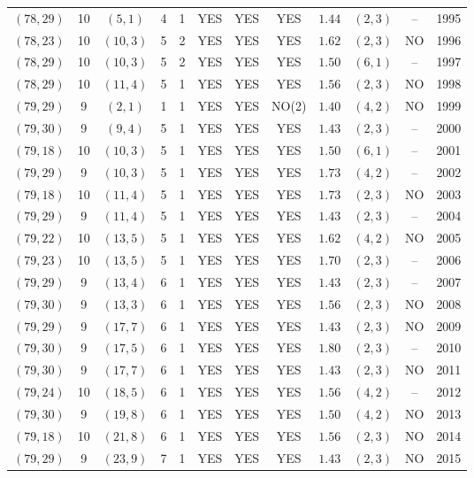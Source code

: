 \begin{longtable}{|c|c|c|c|c|c|c|c|c|c|c|c|}
$(78,29)$ & 10 & $(5,1)$ & 4 & 1 & YES & YES & YES & $1.44$ & $(2,3)$ & -- & 1995\\
$(78,23)$ & 10 & $(10,3)$ & 5 & 2 & YES & YES & YES & $1.62$ & $(2,3)$ & NO & 1996\\
$(78,29)$ & 10 & $(10,3)$ & 5 & 2 & YES & YES & YES & $1.50$ & $(6,1)$ & -- & 1997\\
$(78,29)$ & 10 & $(11,4)$ & 5 & 1 & YES & YES & YES & $1.56$ & $(2,3)$ & NO & 1998\\
$(79,29)$ & 9 & $(2,1)$ & 1 & 1 & YES & YES & NO(2) & $1.40$ & $(4,2)$ & NO & 1999\\
$(79,30)$ & 9 & $(9,4)$ & 5 & 1 & YES & YES & YES & $1.43$ & $(2,3)$ & -- & 2000\\
$(79,18)$ & 10 & $(10,3)$ & 5 & 1 & YES & YES & YES & $1.50$ & $(6,1)$ & -- & 2001\\
$(79,29)$ & 9 & $(10,3)$ & 5 & 1 & YES & YES & YES & $1.73$ & $(4,2)$ & -- & 2002\\
$(79,18)$ & 10 & $(11,4)$ & 5 & 1 & YES & YES & YES & $1.73$ & $(2,3)$ & NO & 2003\\
$(79,29)$ & 9 & $(11,4)$ & 5 & 1 & YES & YES & YES & $1.43$ & $(2,3)$ & -- & 2004\\
$(79,22)$ & 10 & $(13,5)$ & 5 & 1 & YES & YES & YES & $1.62$ & $(4,2)$ & NO & 2005\\
$(79,23)$ & 10 & $(13,5)$ & 5 & 1 & YES & YES & YES & $1.70$ & $(2,3)$ & -- & 2006\\
$(79,29)$ & 9 & $(13,4)$ & 6 & 1 & YES & YES & YES & $1.43$ & $(2,3)$ & -- & 2007\\
$(79,30)$ & 9 & $(13,3)$ & 6 & 1 & YES & YES & YES & $1.56$ & $(2,3)$ & NO & 2008\\
$(79,29)$ & 9 & $(17,7)$ & 6 & 1 & YES & YES & YES & $1.43$ & $(2,3)$ & NO & 2009\\
$(79,30)$ & 9 & $(17,5)$ & 6 & 1 & YES & YES & YES & $1.80$ & $(2,3)$ & -- & 2010\\
$(79,30)$ & 9 & $(17,7)$ & 6 & 1 & YES & YES & YES & $1.43$ & $(2,3)$ & NO & 2011\\
$(79,24)$ & 10 & $(18,5)$ & 6 & 1 & YES & YES & YES & $1.56$ & $(4,2)$ & -- & 2012\\
$(79,30)$ & 9 & $(19,8)$ & 6 & 1 & YES & YES & YES & $1.50$ & $(4,2)$ & NO & 2013\\
$(79,18)$ & 10 & $(21,8)$ & 6 & 1 & YES & YES & YES & $1.56$ & $(2,3)$ & NO & 2014\\
$(79,29)$ & 9 & $(23,9)$ & 7 & 1 & YES & YES & YES & $1.43$ & $(2,3)$ & NO & 2015\\

\end{longtable}

